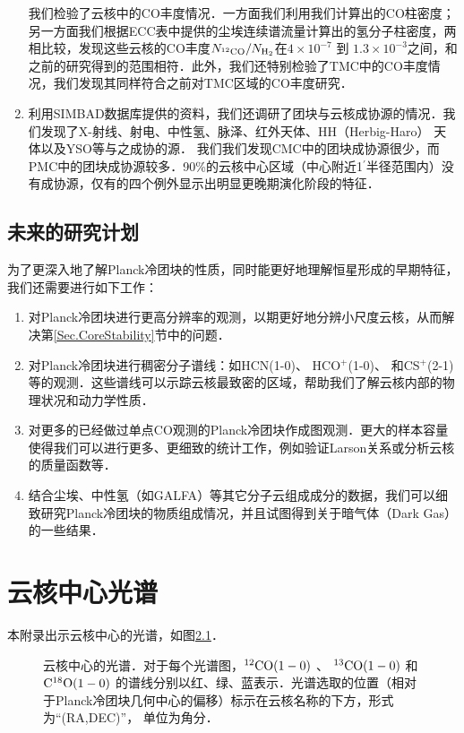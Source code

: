 \documentclass[UTF8, nocolorlinks]{pkuthss}
\newcommand{\coaa}{$\rm^{12}CO(1-0)$ }
\newcommand{\cobb}{$\rm^{13}CO(1-0)$ }
\newcommand{\cocc}{$\rm C^{18}O(1-0)$ }
\newcommand{\arcmin}{$^{\prime}$}
\begin{document}
\begin{enumerate}
	    	我们检验了云核中的CO丰度情况．一方面我们利用我们计算出的CO柱密度；另一方面我们根据ECC表中提供的尘埃连续谱流量计算出的氢分子柱密度，两相比较，发现这些云核的CO丰度$N_{\rm^{12}CO}/N_{\rm H_{2}}$在$4\times 10^{-7}$ 到 $1.3\times 10^{-3 }$之间，和之前的研究得到的范围相符\supercite{1988ApJ...334..771V}．此外，我们还特别检验了TMC中的CO丰度情况，我们发现其同样符合之前对TMC区域的CO丰度研究\supercite{1982ApJ...262..590F}．
	    \item
	    	利用SIMBAD数据库提供的资料，我们还调研了团块与云核成协源的情况．我们发现了X-射线、射电、中性氢、脉泽、红外天体、HH（Herbig-Haro） 天体以及YSO等与之成协的源． 我们我们发现CMC中的团块成协源很少，而PMC中的团块成协源较多．90\%的云核中心区域（中心附近1\arcmin 半径范围内）没有成协源，仅有的四个例外显示出明显更晚期演化阶段的特征．
    	\end{enumerate}
	\section{未来的研究计划}
		为了更深入地了解Planck冷团块的性质，同时能更好地理解恒星形成的早期特征，我们还需要进行如下工作：
		\begin{enumerate}
		 \item
		 	对Planck冷团块进行更高分辨率的观测，以期更好地分辨小尺度云核，从而解决第\ref{Sec.CoreStability}节中的问题．
	     \item 
	     	对Planck冷团块进行稠密分子谱线：如HCN(1-0)、 HCO$^+$(1-0)、 和CS$^+$(2-1)等的观测．这些谱线可以示踪云核最致密的区域，帮助我们了解云核内部的物理状况和动力学性质．
	     \item
	     	对更多的已经做过单点CO观测的Planck冷团块作成图观测．更大的样本容量使得我们可以进行更多、更细致的统计工作，例如验证Larson\supercite{1981MNRAS.194..809L}关系或分析云核的质量函数等．
	     \item
	     	结合尘埃、中性氢（如GALFA\supercite{2012ApJ...758...44S}）等其它分子云组成成分的数据，我们可以细致研究Planck冷团块的物质组成情况，并且试图得到关于暗气体\supercite{2005Sci...307.1292G}（Dark Gas）的一些结果．
    	\end{enumerate}
\appendix 

\printbibliography[heading = bibintoc]

\chapter{云核中心光谱}\label{App.Spectra}
	本附录出示云核中心的光谱，如图\ref{Fig.Spectra}．

	\begin{figure}[h]
		\caption{云核中心的光谱．对于每个光谱图，\coaa 、 \cobb 和 \cocc   的谱线分别以红、绿、蓝表示．光谱选取的位置（相对于Planck冷团块几何中心的偏移）标示在云核名称的下方，形式为“(RA,DEC)”， 单位为角分．\label{Fig.Spectra}}
	\end{figure}
		\vspace{-4mm}
		
\end{document}
